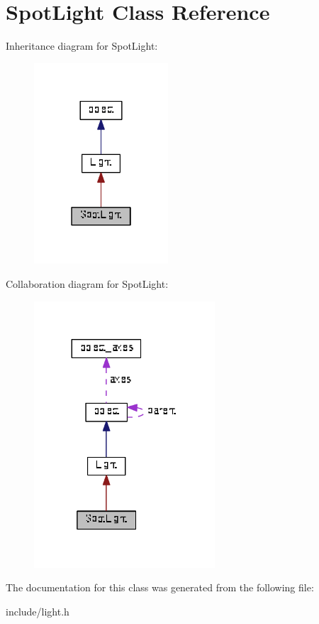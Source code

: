 \hypertarget{classSpotLight}{}\section{Spot\+Light Class Reference}
\label{classSpotLight}


Inheritance diagram for Spot\+Light\+:\nopagebreak
\begin{figure}[H]
\begin{center}
\leavevmode
\includegraphics[width=142pt]{classSpotLight__inherit__graph}
\end{center}
\end{figure}


Collaboration diagram for Spot\+Light\+:\nopagebreak
\begin{figure}[H]
\begin{center}
\leavevmode
\includegraphics[width=191pt]{classSpotLight__coll__graph}
\end{center}
\end{figure}


The documentation for this class was generated from the following file\+:\begin{DoxyCompactItemize}
\item 
include/light.\+h\end{DoxyCompactItemize}
